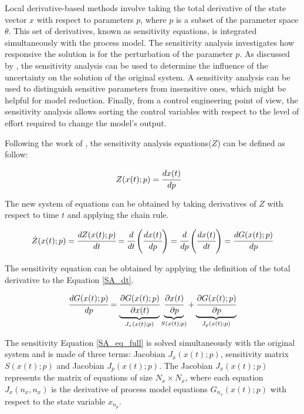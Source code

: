 \documentclass[../Article_Sensitivity_Analsysis.tex]{subfiles}
\begin{document}
	
	Local derivative-based methods involve taking the total derivative of the state vector $x$ with respect to parameters $p$, where $p$ is a subset of the parameter space $\theta$. This set of derivatives, known as sensitivity equations, is integrated simultaneously with the process model. The sensitivity analysis investigates how responsive the solution is for the perturbation of the parameter $p$. As discussed by \citet{Dickinson1976}, the sensitivity analysis can be used to determine the influence of the uncertainty on the solution of the original system. A sensitivity analysis can be used to distinguish sensitive parameters from insensitive ones, which might be helpful for model reduction. Finally, from a control engineering point of view, the sensitivity analysis allows sorting the control variables with respect to the level of effort required to change the model's output.
	
	Following the work of \citet{Maly1996}, the sensitivity analysis equations(${\dot{Z}}$) can be defined as follow:
	
	{\footnotesize
		\begin{align}
			\label{SA_def}
			{Z}(x(t);p) &= \cfrac{dx(t)}{dp}
	\end{align} }
	
	The new system of equations can be obtained by taking derivatives of $Z$ with respect to time $t$ and applying the chain rule.
	
	{\footnotesize
		\begin{equation} \label{SA_dt} 
			{\dot{Z}}(x(t);p)  = \cfrac{dZ(x(t);p)}{d t} = \cfrac{d}{d t} \left( \cfrac{dx(t)}{dp} \right) = \cfrac{d }{dp} \left( \cfrac{dx(t)}{d t} \right) = \cfrac{d {G}(x(t);p)}{dp} 
	\end{equation} }
	
	The sensitivity equation can be obtained by applying the definition of the total derivative to the Equation \ref{SA_dt}.
	
	{\footnotesize
		\begin{equation} \label{SA_eq_full}
			\cfrac{dG(x(t);p)}{dp} = \underbrace{ \cfrac{\partial {G}(x(t);p)}{\partial x(t)} }_{{J_x}(x(t);p)} \underbrace{\cfrac{\partial x(t)}{\partial p} }_{S(x(t);p)} + \underbrace{ \cfrac{\partial {G}(x(t);p)}{\partial p} }_{{J_p}(x(t);p)}
	  \end{equation} }
	
	The sensitivity Equation \ref{SA_eq_full} is solved simultaneously with the original system and is made of three terms: Jacobian ${J_x}(x(t);p)$, sensitivity matrix $S(x(t);p)$ and Jacobian ${J_p}(x(t);p)$. The Jacobian ${J_x}(x(t);p)$ represents the matrix of equations of size $N_x \times N_x$, where each equation ${J_x}(n_x,n_x)$ is the derivative of process model equations ${G}_{n_x}(x(t);p)$ with respect to the state variable $x_{n_p}$.
	
\end{document}
